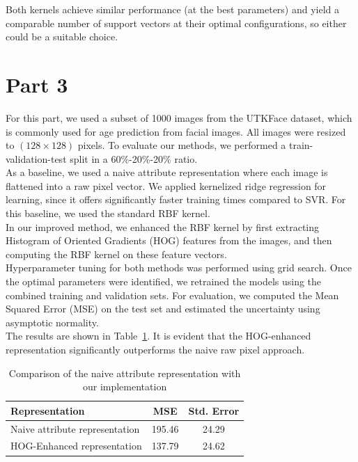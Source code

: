 \documentclass[9pt]{IEEEtran}
\begin{document}
Both kernels achieve similar performance (at the best parameters) and yield a comparable number 
of support vectors at their optimal configurations, so either could be a
 suitable choice.

 \newpage
\section{Part 3}
For this part, we used a subset of 1000 images from the UTKFace dataset, which is commonly used 
for age prediction from facial images. All images were resized to $(128 \times 128)$ pixels. 
To evaluate our methods, we performed a train-validation-test split in a 60\%-20\%-20\% ratio.
\\

As a baseline, we used a naive attribute representation where each image is flattened into a 
raw pixel vector. We applied kernelized ridge regression for learning, since it offers significantly 
faster training times compared to SVR. For this baseline, we used the standard
RBF kernel.
\\

In our improved method, we enhanced the RBF kernel by first extracting Histogram of Oriented Gradients (HOG) features from the images, and then computing the RBF kernel on these feature vectors.
\\

Hyperparameter tuning for both methods was performed using grid search. Once the optimal parameters were identified, we retrained the models using the combined training and validation sets. For evaluation, we computed the Mean Squared Error (MSE) on the test set and estimated the uncertainty using asymptotic normality.
\\

The results are shown in Table~\ref{tab:res}. It is evident that the HOG-enhanced representation significantly 
outperforms the naive raw pixel approach.


\vspace{5pt}
\begin{table}[h!]
\centering
\begin{tabular}{lcc}
Representation         & MSE    & Std. Error \\
\hline
Naive attribute representation         & 195.46 & 24.29      \\
HOG-Enhanced representation  & 137.79 & 24.62      \\
\end{tabular}
\vspace{5pt}
\caption{Comparison of the naive attribute representation with our implementation}
\label{tab:res}
\end{table}





\end{document}
